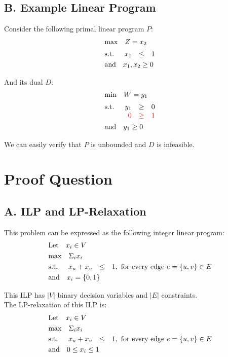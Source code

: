 \documentclass[12pt]{article}
\begin{document}
\newpage
\subsection{B. Example Linear Program}
Consider the following primal linear program $P$:
\begin{align*}
  &\mathrm{max} \quad Z = x_2 \\[2pt]
  &\mathrm{s.t.} \quad 
  \begin{array}[t]{r c r}
      x_1 & \leq & 1
  \end{array}\\
  &\mathrm{and} \quad x_1, x_2 \geq 0
\end{align*}

\noindent
And its dual $D$:
\begin{align*}
  &\mathrm{min} \quad W = y_1 \\[2pt]
  &\mathrm{s.t.} \quad 
  \begin{array}[t]{r c r}
      y_1 & \geq & 0 \\
      \textcolor{red}{0} & \textcolor{red}{\geq} & \textcolor{red}{1}
  \end{array}\\
  &\mathrm{and} \quad y_1 \geq 0
\end{align*}

\noindent
We can easily verify that $P$ is unbounded and $D$ is infeasible.

%
%
\section{Proof Question}
\subsection{A. ILP and LP-Relaxation}
This problem can be expressed as the following integer linear program:
\begin{align*}
  &\mathrm{Let} \quad x_i \in V \\
  &\mathrm{max} \quad \Sigma_{i} x_i \\
  &\mathrm{s.t.} \quad 
  \begin{array}[t]{r c r}
      x_u + x_v & \leq & 1, \text{ for every edge } e = \{u, v\} \in E 
  \end{array}\\
  &\mathrm{and} \quad x_i = \{0, 1\}
\end{align*}

\noindent
This ILP has $|V|$ binary decision variables and $|E|$ constraints.\\
The LP-relaxation of this ILP is:
\begin{align*}
  &\mathrm{Let} \quad x_i \in V \\
  &\mathrm{max} \quad \Sigma_{i} x_i \\
  &\mathrm{s.t.} \quad 
  \begin{array}[t]{r c r}
      x_u + x_v & \leq & 1, \text{ for every edge } e = \{u, v\} \in E 
  \end{array}\\
  &\mathrm{and} \quad 0 \leq x_i \leq 1
\end{align*}
\end{document}
